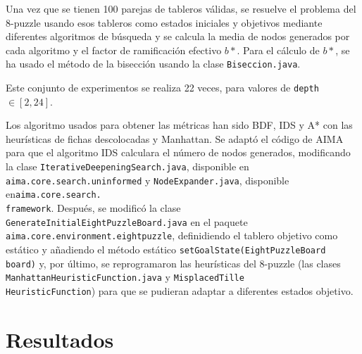 \documentclass[a4paper, 10pt]{article}
\begin{document}
Una vez que se tienen 100 parejas de tableros válidas, se resuelve el problema del 8-puzzle usando esos tableros como estados iniciales y objetivos mediante diferentes algoritmos de búsqueda y se calcula la media de nodos generados por cada algoritmo y el factor de ramificación efectivo $b*$. Para el cálculo de $b*$, se ha usado el método de la bisección usando la clase \texttt{Biseccion.java}.

Este conjunto de experimentos se realiza 22 veces, para valores de \texttt{depth} $\in [2, 24]$.

Los algoritmo usados para obtener las métricas han sido BDF, IDS y A* con las heurísticas de fichas descolocadas y Manhattan. Se adaptó el código de AIMA para que el algoritmo IDS calculara el número de nodos generados, modificando la clase \texttt{IterativeDeepeningSearch.java}, disponible en \texttt{aima.core.search.uninformed} y \texttt{NodeExpander.java}, disponible en\texttt{aima.core.search.\\framework}. Después, se modificó la clase \texttt{GenerateInitialEightPuzzleBoard.java} en el paquete \texttt{aima.core.environment.eightpuzzle}, definidiendo el tablero objetivo como estático y añadiendo el método estático \texttt{setGoalState(EightPuzzleBoard board)}
 y, por último, se reprogramaron las heurísticas del 8-puzzle (las clases \texttt{ManhattanHeuristicFunction.java} y \texttt{MisplacedTille\\HeuristicFunction}) para que se pudieran adaptar a diferentes estados objetivo.


\section{Resultados}
\end{document}
